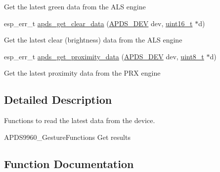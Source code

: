 \begin{DoxyCompactItemize}
\begin{DoxyCompactList}
\begin{DoxyItemize}
\item Get the latest green data from the A\+LS engine 
\end{DoxyItemize}\end{DoxyCompactList}\item 
esp\+\_\+err\+\_\+t \hyperlink{group__APDS9960__DataFunctions_ga847d2ca19238c7a2a84080549962c7df}{apds\+\_\+get\+\_\+clear\+\_\+data} (\hyperlink{structAPDS9960__Driver}{A\+P\+D\+S\+\_\+\+D\+EV} dev, \hyperlink{vl53l0x__types_8h_a273cf69d639a59973b6019625df33e30}{uint16\+\_\+t} $\ast$d)
\begin{DoxyCompactList}\small\item\em 
\begin{DoxyItemize}
\item Get the latest clear (brightness) data from the A\+LS engine 
\end{DoxyItemize}\end{DoxyCompactList}\item 
esp\+\_\+err\+\_\+t \hyperlink{group__APDS9960__DataFunctions_ga9d2e3d18bf1d952068582fe97b0c8afa}{apds\+\_\+get\+\_\+proximity\+\_\+data} (\hyperlink{structAPDS9960__Driver}{A\+P\+D\+S\+\_\+\+D\+EV} dev, \hyperlink{vl53l0x__types_8h_aba7bc1797add20fe3efdf37ced1182c5}{uint8\+\_\+t} $\ast$d)
\begin{DoxyCompactList}\small\item\em 
\begin{DoxyItemize}
\item Get the latest proximity data from the P\+RX engine 
\end{DoxyItemize}\end{DoxyCompactList}\end{DoxyCompactItemize}


\subsection{Detailed Description}
Functions to read the latest data from the device. 

A\+P\+D\+S9960\+\_\+\+Gesture\+Functions Get results 

\subsection{Function Documentation}
\mbox{\label{group__APDS9960__DataFunctions_ga3d1a4e5592ac0a2e3cf82e66f58eb7db}} 
